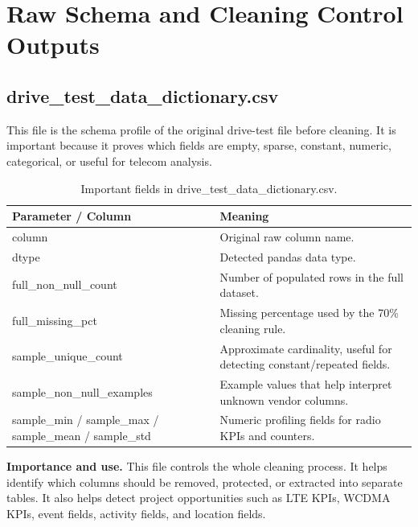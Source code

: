 \documentclass[12pt,a4paper]{article}
\begin{document}
\section{Raw Schema and Cleaning Control Outputs}

\subsection{drive\_test\_data\_dictionary.csv}
This file is the schema profile of the original drive-test file before cleaning. It is important because it proves which fields are empty, sparse, constant, numeric, categorical, or useful for telecom analysis.


\begin{table}[H]
\centering
\begin{tabularx}{\textwidth}{P{0.38\textwidth}Y}
\toprule
\textbf{Parameter / Column} & \textbf{Meaning} \\
\midrule
{\ttfamily column} & Original raw column name. \\
{\ttfamily dtype} & Detected pandas data type. \\
{\ttfamily full\_\allowbreak{}non\_\allowbreak{}null\_\allowbreak{}count} & Number of populated rows in the full dataset. \\
{\ttfamily full\_\allowbreak{}missing\_\allowbreak{}pct} & Missing percentage used by the 70\% cleaning rule. \\
{\ttfamily sample\_\allowbreak{}unique\_\allowbreak{}count} & Approximate cardinality, useful for detecting constant/repeated fields. \\
{\ttfamily sample\_\allowbreak{}non\_\allowbreak{}null\_\allowbreak{}examples} & Example values that help interpret unknown vendor columns. \\
{\ttfamily sample\_\allowbreak{}min /\allowbreak{} sample\_\allowbreak{}max /\allowbreak{} sample\_\allowbreak{}mean /\allowbreak{} sample\_\allowbreak{}std} & Numeric profiling fields for radio KPIs and counters. \\
\bottomrule
\end{tabularx}
\caption{Important fields in drive\_test\_data\_dictionary.csv.}
\end{table}


\textbf{Importance and use.} This file controls the whole cleaning process. It helps identify which columns should be removed, protected, or extracted into separate tables. It also helps detect project opportunities such as LTE KPIs, WCDMA KPIs, event fields, activity fields, and location fields.
\end{document}
